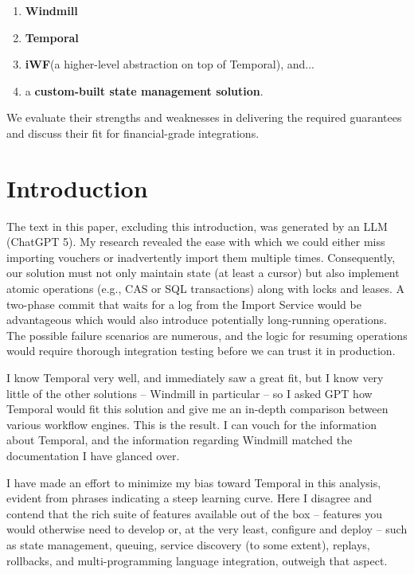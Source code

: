 \documentclass[11pt, a4paper, twocolumn]{article} %
\begin{document}
\begin{enumerate}
\item \textbf{Windmill}
\item \textbf{Temporal}
\item \textbf{iWF}\newline(a higher-level abstraction on top of Temporal), and...
\item a \textbf{custom-built state management solution}.
\end{enumerate}

We evaluate their strengths and weaknesses in delivering the required guarantees and discuss their fit for financial-grade integrations.

\clearpage

\color{Black}

\section*{Introduction}

The text in this paper, excluding this introduction, was generated by an LLM (ChatGPT 5). My research revealed the ease with which we could either miss importing vouchers or inadvertently import them multiple times. Consequently, our solution must not only maintain state (at least a cursor) but also implement atomic operations (e.g., CAS or SQL transactions) along with locks and leases. A two-phase commit that waits for a log from the Import Service would be advantageous which would also introduce potentially long-running operations. The possible failure scenarios are numerous, and the logic for resuming operations would require thorough integration testing before we can trust it in production.

I know Temporal very well, and immediately saw a great fit, but I know very little of the other solutions -- Windmill in particular -- so I asked GPT how Temporal would fit this solution and give me an in-depth comparison between various workflow engines. This is the result. I can vouch for the information about Temporal, and the information regarding Windmill matched the documentation I have glanced over.

I have made an effort to minimize my bias toward Temporal in this analysis, evident from phrases indicating a steep learning curve. Here I disagree and contend that the rich suite of features available out of the box -- features you would otherwise need to develop or, at the very least, configure and deploy -- such as state management, queuing, service discovery (to some extent), replays, rollbacks, and multi-programming language integration, outweigh that aspect.
\end{document}
